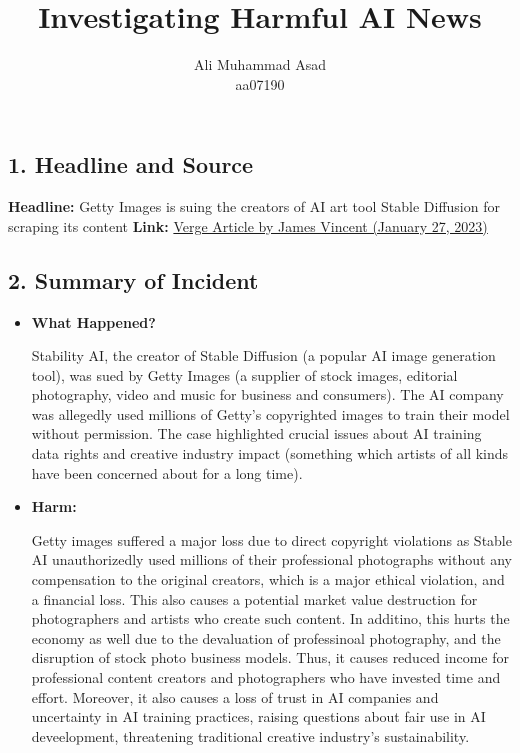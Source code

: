 \documentclass{article}
\title{Investigating Harmful AI News}
\author{Ali Muhammad Asad \\ aa07190}
\date{} %
\theoremstyle{mytheoremstyle}
\theoremstyle{mytheoremstyle}
\theoremstyle{myproblemstyle}
\begin{document}
    \maketitle

\subsection*{1. Headline and Source}

\noindent \textbf{Headline:} Getty Images is suing the creators of AI art tool Stable Diffusion for scraping its content
\noindent \textbf{Link:} \href{https://www.theverge.com/2023/1/17/23558516/ai-art-copyright-stable-diffusion-getty-images-lawsuit}{Verge Article by James Vincent (January 27, 2023)}

\subsection*{2. Summary of Incident}
\begin{itemize}
    \item \textbf{What Happened?}
    
    Stability AI, the creator of Stable Diffusion (a popular AI image generation tool), was sued by Getty Images (a supplier of stock images, editorial photography, video and music for business and consumers). The AI company was allegedly used millions of Getty's copyrighted images to train their model without permission. The case highlighted crucial issues about AI training data rights and creative industry impact (something which artists of all kinds have been concerned about for a long time).

    \item \textbf{Harm:}
    
    Getty images suffered a major loss due to direct copyright violations as Stable AI unauthorizedly used millions of their professional photographs without any compensation to the original creators, which is a major ethical violation, and a financial loss. This also causes a potential market value destruction for photographers and artists who create such content. In additino, this hurts the economy as well due to the devaluation of professinoal photography, and the disruption of stock photo business models. Thus, it causes reduced income for professional content creators and photographers who have invested time and effort. Moreover, it also causes a loss of trust in AI companies and uncertainty in AI training practices, raising questions about fair use in AI deveelopment, threatening traditional creative industry's sustainability. 
\end{itemize}
\end{document}

